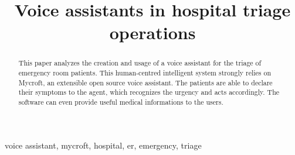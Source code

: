 \documentclass[conference]{IEEEtran}
\begin{document}
\title{Voice assistants in hospital triage operations}

\author{
    \and
    \and
    \and
}

\maketitle

\begin{abstract}
    This paper analyzes the creation and usage of a voice assistant for the triage of emergency room patients. This human-centred intelligent system strongly relies on Mycroft, an extensible open source voice assistant. The patients are able to declare their symptoms to the agent, which recognizes the urgency and acts accordingly. The software can even provide useful medical informations to the users.
\end{abstract}

\begin{IEEEkeywords}
    voice assistant, mycroft, hospital, er, emergency, triage
\end{IEEEkeywords}
\end{document}
